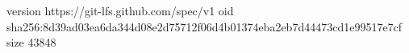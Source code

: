 version https://git-lfs.github.com/spec/v1
oid sha256:8d39ad03ea6da344d08e2d75712f06d4b01374eba2eb7d44473cd1e99517e7cf
size 43848
